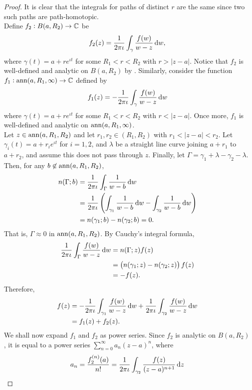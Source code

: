 		\begin{proof}
			It is clear that the integrals for paths of distinct $r$ are the same since two such paths are path-homotopic.\\
			Define $f_2 : B(a,R_2) \to \mathbb{C}$ be
			\[ f_2(z) = \frac{1}{2\pi\iota} \int_{\gamma} \frac{f(w)}{w-z} \dif w, \]
			where $\gamma(t) = a+re^{\iota t}$ for some $R_1 < r < R_2$ with $r > |z-a|$. Notice that $f_2$ is well-defined and analytic on $B(a,R_2)$ by . Similarly, consider the function $f_1 : \operatorname{ann}(a,R_1,\infty) \to \mathbb{C}$ defined by
			\[ f_1(z) = - \frac{1}{2\pi\iota} \int_{\gamma} \frac{f(w)}{w-z} \dif w \]
			where $\gamma(t) = a+re^{\iota t}$ for some $R_1 < r < R_2$ with $r < |z-a|$. Once more, $f_1$ is well-defined and analytic on $\operatorname{ann}(a,R_1,\infty)$.\\
			Let $z \in \operatorname{ann}(a,R_1,R_2)$ and let $r_1,r_2 \in (R_1,R_2)$ with $r_1 < |z-a| < r_2$. Let $\gamma_i(t) = a + r_i e^{\iota t}$ for $i=1,2$, and $\lambda$ be a straight line curve joining $a+r_1$ to $a+r_2$, and assume this does not pass through $z$. Finally, let $\Gamma = \gamma_1 + \lambda - \gamma_2 - \lambda$. Then, for any $b \not\in \operatorname{ann}(a,R_1,R_2)$,
			\begin{align*}
				n(\Gamma;b) &= \frac{1}{2\pi\iota} \int_{\Gamma} \frac{1}{w-b} \dif w \\
					&= \frac{1}{2\pi\iota} \left( \int_{\gamma_1} \frac{1}{w-b} \dif w - \int_{\gamma_2} \frac{1}{w-b} \dif w \right) \\
					&= n(\gamma_1;b) - n(\gamma_2;b) = 0.
			\end{align*}
			That is, $\Gamma \approx 0$ in $\operatorname{ann}(a,R_1,R_2)$. By Cauchy's integral formula,
			\begin{align*}
				\frac{1}{2\pi\iota} \int_{\Gamma} \frac{f(w)}{w-z} \dif w &= n(\Gamma;z) f(z) \\
					&= \left( n(\gamma_1;z) - n(\gamma_2;z) \right) f(z) \\
					&= -f(z).
			\end{align*}
			Therefore,
			\begin{align*}
				f(z) &= - \frac{1}{2\pi\iota} \int_{\gamma_1} \frac{f(w)}{w-z} \dif w + \frac{1}{2\pi\iota} \int_{\gamma_2} \frac{f(w)}{w-z} \dif w \\
					&= f_1(z) + f_2(z).
			\end{align*}
			We shall now expand $f_1$ and $f_2$ as power series. Since $f_2$ is analytic on $B(a,R_2)$, it is equal to a power series $\sum_{n=0}^{\infty} a_n (z-a)^n$, where
			\[ a_n = \frac{f_2^{(n)}(a)}{n!} = \frac{1}{2\pi\iota} \int_{\gamma_2} \frac{f(z)}{(z-a)^{n+1}} \dif z \]

\end{proof}
